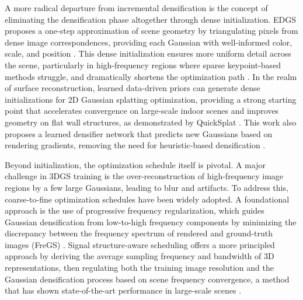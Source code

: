 \documentclass[11pt]{article}
\begin{document}
A more radical departure from incremental densification is the concept of eliminating the densification phase altogether through dense initialization. EDGS proposes a one-step approximation of scene geometry by triangulating pixels from dense image correspondences, providing each Gaussian with well-informed color, scale, and position \cite{ref138}. This dense initialization ensures more uniform detail across the scene, particularly in high-frequency regions where sparse keypoint-based methods struggle, and dramatically shortens the optimization path \cite{ref138}. In the realm of surface reconstruction, learned data-driven priors can generate dense initializations for 2D Gaussian splatting optimization, providing a strong starting point that accelerates convergence on large-scale indoor scenes and improves geometry on flat wall structures, as demonstrated by QuickSplat \cite{ref139}. This work also proposes a learned densifier network that predicts new Gaussians based on rendering gradients, removing the need for heuristic-based densification \cite{ref139}.

Beyond initialization, the optimization schedule itself is pivotal. A major challenge in 3DGS training is the over-reconstruction of high-frequency image regions by a few large Gaussians, leading to blur and artifacts. To address this, coarse-to-fine optimization schedules have been widely adopted. A foundational approach is the use of progressive frequency regularization, which guides Gaussian densification from low-to-high frequency components by minimizing the discrepancy between the frequency spectrum of rendered and ground-truth images (FreGS) \cite{ref75}. Signal structure-aware scheduling offers a more principled approach by deriving the average sampling frequency and bandwidth of 3D representations, then regulating both the training image resolution and the Gaussian densification process based on scene frequency convergence, a method that has shown state-of-the-art performance in large-scale scenes \cite{ref140}.
\end{document}
